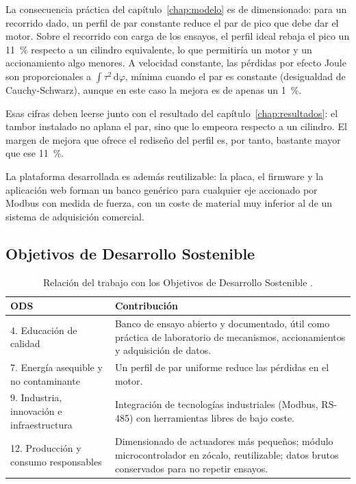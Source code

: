 La consecuencia práctica del capítulo~\ref{chap:modelo} es de dimensionado: para un recorrido dado,
un perfil de par constante reduce el par de pico que debe dar el motor. Sobre el recorrido con carga
de los ensayos, el perfil ideal rebaja el pico un \SI{11}{\percent} respecto a un cilindro
equivalente, lo que permitiría un motor y un accionamiento algo menores. A velocidad constante, las
pérdidas por efecto Joule son proporcionales a $\int\tau^2\,\mathrm{d}\varphi$, mínima cuando el par
es constante (desigualdad de Cauchy-Schwarz), aunque en este caso la mejora es de apenas un
\SI{1}{\percent}.

Esas cifras deben leerse junto con el resultado del capítulo~\ref{chap:resultados}: el tambor
instalado no aplana el par, sino que lo empeora respecto a un cilindro. El margen de mejora que
ofrece el rediseño del perfil es, por tanto, bastante mayor que ese \SI{11}{\percent}.

La plataforma desarrollada es además reutilizable: la placa, el firmware y la aplicación web forman
un banco genérico para cualquier eje accionado por Modbus con medida de fuerza, con un coste de
material muy inferior al de un sistema de adquisición comercial.

\subsection{Objetivos de Desarrollo Sostenible}

\begin{table}[H]
\centering
\caption{Relación del trabajo con los Objetivos de Desarrollo Sostenible \cite{agenda2030}.}
\label{tab:ods}
\begin{tabularx}{\textwidth}{@{}lX@{}}
\toprule
ODS & Contribución \\
\midrule
4. Educación de calidad & Banco de ensayo abierto y documentado, útil como práctica de laboratorio de mecanismos, accionamientos y adquisición de datos. \\
7. Energía asequible y no contaminante & Un perfil de par uniforme reduce las pérdidas en el motor. \\
9. Industria, innovación e infraestructura & Integración de tecnologías industriales (Modbus, RS-485) con herramientas libres de bajo coste. \\
12. Producción y consumo responsables & Dimensionado de actuadores más pequeños; módulo microcontrolador en zócalo, reutilizable; datos brutos conservados para no repetir ensayos. \\
\bottomrule
\end{tabularx}
\end{table}

